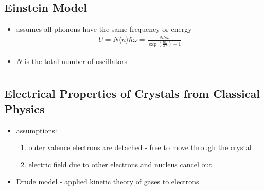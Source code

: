 \documentclass[a4paper,11pt,normalem]{article}
\begin{document}
\subsection{Einstein Model}

\begin{itemize}
    \item assumes all phonons have the same frequency or energy
        \begin{align*}
            U = N\langle n\rangle\hbar\omega = \frac{N\hbar\omega}{\exp\left(\frac{\hbar\omega}{kT}\right) - 1}
        \end{align*}
    \item \(N\) is the total number of oscillators
\end{itemize}

\section{}

\subsection{Electrical Properties of Crystals from Classical Physics}

\begin{itemize}
    \item assumptions:
        \begin{enumerate}
            \item outer valence electrons are detached - free to move through the crystal
            \item electric field due to other electrons and nucleus cancel out
        \end{enumerate}
    \item Drude model - applied kinetic theory of gases to electrons
\end{itemize}
\end{document}
